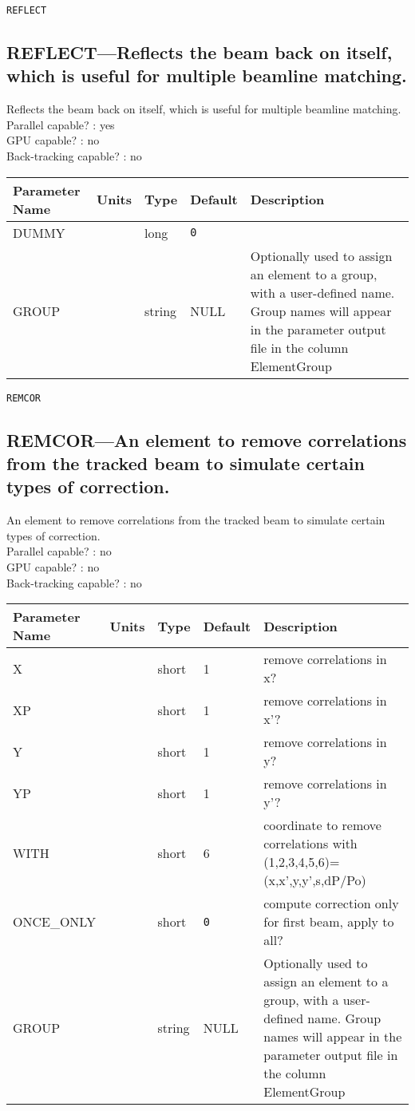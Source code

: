 \newpage
\begin{center}{\Large\verb|REFLECT|}\end{center}
\subsection{REFLECT---Reflects the beam back on itself, which is useful for multiple beamline matching.}
Reflects the beam back on itself, which is useful for multiple beamline matching.
\\
Parallel capable? : yes\\
GPU capable? : no\\
Back-tracking capable? : no\\
\begin{tabular}{|l|l|l|l|p{\descwidth}|} \hline
Parameter Name & Units & Type & Default & Description \\ \hline 
DUMMY &  & long &  \verb|0| & \\ \hline 
GROUP &  & string & NULL & Optionally used to assign an element to a group, with a user-defined name.  Group names will appear in the parameter output file in the column ElementGroup  \\ \hline 
\end{tabular}

\newpage
\begin{center}{\Large\verb|REMCOR|}\end{center}
\subsection{REMCOR---An element to remove correlations from the tracked beam to simulate certain types of correction.}
An element to remove correlations from the tracked beam to simulate certain types of correction.
\\
Parallel capable? : no\\
GPU capable? : no\\
Back-tracking capable? : no\\
\begin{tabular}{|l|l|l|l|p{\descwidth}|} \hline
Parameter Name & Units & Type & Default & Description \\ \hline 
X &  & short &   1               & remove correlations in x?  \\ \hline 
XP &  & short &   1               & remove correlations in x'?  \\ \hline 
Y &  & short &   1               & remove correlations in y?  \\ \hline 
YP &  & short &   1               & remove correlations in y'?  \\ \hline 
WITH &  & short &   6               & coordinate to remove correlations with (1,2,3,4,5,6)=(x,x',y,y',s,dP/Po)  \\ \hline 
ONCE\_ONLY &  & short &  \verb|0| & compute correction only for first beam, apply to all?  \\ \hline 
GROUP &  & string & NULL & Optionally used to assign an element to a group, with a user-defined name.  Group names will appear in the parameter output file in the column ElementGroup  \\ \hline 
\end{tabular}

